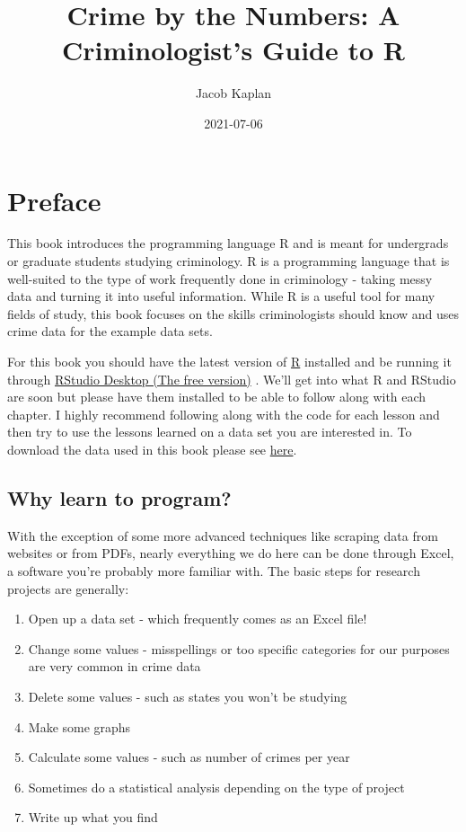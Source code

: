 \documentclass[
  12pt,
  openany]{book}
\title{Crime by the Numbers: A Criminologist's Guide to R}
\author{Jacob Kaplan}
\date{2021-07-06}
\providecommand{\tightlist}{%
  \setlength{\itemsep}{0pt}\setlength{\parskip}{0pt}}
\begin{document}
\maketitle

{
\hypersetup{linkcolor=}
\setcounter{tocdepth}{2}
\tableofcontents
}
\hypertarget{preface}{%
\chapter{Preface}\label{preface}}

This book introduces the programming language R and is meant for undergrads or graduate students studying criminology. R is a programming language that is well-suited to the type of work frequently done in criminology - taking messy data and turning it into useful information. While R is a useful tool for many fields of study, this book focuses on the skills criminologists should know and uses crime data for the example data sets.

For this book you should have the latest version of \href{https://cloud.r-project.org/}{R} installed and be running it through \href{https://www.rstudio.com/products/rstudio/download/}{RStudio Desktop (The free version)} . We'll get into what R and RStudio are soon but please have them installed to be able to follow along with each chapter. I highly recommend following along with the code for each lesson and then try to use the lessons learned on a data set you are interested in. To download the data used in this book please see \href{https://github.com/jacobkap/r4crimz/tree/master/data}{here}.

\hypertarget{why-learn-to-program}{%
\section{Why learn to program?}\label{why-learn-to-program}}

With the exception of some more advanced techniques like scraping data from websites or from PDFs, nearly everything we do here can be done through Excel, a software you're probably more familiar with. The basic steps for research projects are generally:

\begin{enumerate}
\def\labelenumi{\arabic{enumi}.}
\tightlist
\item
  Open up a data set - which frequently comes as an Excel file!
\item
  Change some values - misspellings or too specific categories for our purposes are very common in crime data
\item
  Delete some values - such as states you won't be studying
\item
  Make some graphs
\item
  Calculate some values - such as number of crimes per year
\item
  Sometimes do a statistical analysis depending on the type of project
\item
  Write up what you find
\end{enumerate}
\end{document}
